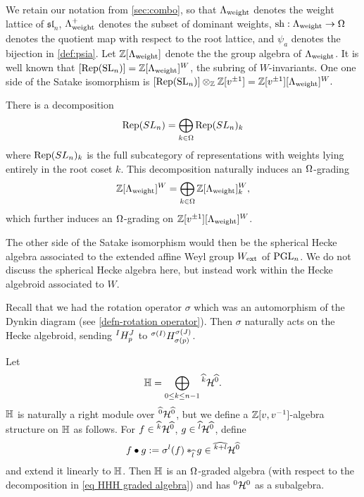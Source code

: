 We retain our notation from \cref{sec:combo}, so that $\Lambda_{\operatorname{weight}}$ denotes the weight lattice of $\mathfrak{sl}_n$, $\Lambda_{\operatorname{weight}}^+$ denotes the subset of dominant weights, $\operatorname{sh}: \Lambda_{\operatorname{weight}} \rightarrow \Omega$ denotes the quotient map with respect to the root lattice, and $\psi_a$ denotes the bijection in \cref{def:psia}.
Let $\mathbb{Z}[\Lambda_{\operatorname{weight}}]$ denote the the group algebra of $\Lambda_{\operatorname{weight}}$.
It is well known that $[\operatorname{Rep}(\operatorname{SL}_n)]=\mathbb{Z}[\Lambda_{\operatorname{weight}}]^W$, the subring of $W$-invariants.
One one side of the Satake isomorphism is $[\operatorname{Rep}(\operatorname{SL}_n)]\otimes_{\mathbb{Z}} \mathbb{Z}[v^{\pm 1}]=\mathbb{Z}[v^{\pm 1}][\Lambda_{\operatorname{weight}}]^W.$

There is a decomposition $$\operatorname{Rep}(SL_n)=\bigoplus_{k \in \Omega}\operatorname{Rep}(SL_n)_{k}$$
where $\operatorname{Rep}(SL_n)_{k}$ is the full subcategory of representations with weights lying entirely in the root coset $k$. 
This decomposition naturally induces an $\Omega$-grading
\begin{equation}\label{eq grading on representation ring of sl_n}
   \mathbb{Z}[\Lambda_{\operatorname{weight}}]^W= \bigoplus_{k \in \Omega}\mathbb{Z}[\Lambda_{\operatorname{weight}}]^W_k,
\end{equation}
which further induces an $\Omega$-grading on $\mathbb{Z}[v^{\pm 1}][\Lambda_{\operatorname{weight}}]^W$.



The other side of the Satake isomorphism would then be the spherical Hecke algebra associated to the extended affine Weyl group $W_{\operatorname{ext}}$ of $\operatorname{PGL}_n$.
We do not discuss the spherical Hecke algebra here, but instead work within the Hecke algebroid associated to $W$.

Recall that we had the rotation operator $\sigma$ which was an automorphism of the Dynkin diagram (see \cref{defn-rotation operator}). 
Then $\sigma$ naturally acts on the Hecke algebroid, sending ${}^{I}H^{J}_{p}$ to ${}^{\sigma(I)}H^{\sigma(J)}_{\sigma(p)}$.

\begin{defn}\label{defn the algebra HHH}
Let 
\begin{equation}\label{eq HHH graded algebra}
    \mathbb{H}=\bigoplus_{0\leq k \leq n-1}{}^{\widehat{k}}\mathcal{H}^{\widehat{0}}.
\end{equation} 
$\mathbb{H}$ is naturally a right module over ${}^{\widehat{0}}\mathcal{H}^{\widehat{0}}$, but we define a $\mathbb{Z}[v,v^{-1}]$-algebra structure on $\mathbb{H}$ as follows.
For $f \in {}^{\widehat{k}}\mathcal{H}^{\widehat{0}}$, $g \in {}^{\widehat{l}}\mathcal{H}^{\widehat{0}}$, define
\begin{equation} \label{eq:badmultyuck}
    f\bullet g:= \sigma^l(f)\ast_{\widehat{l}}g \in {}^{\widehat{k+l}}\mathcal{H}^{\widehat{0}}
\end{equation}
and extend it linearly to $\mathbb{H}$. 
Then $\mathbb{H}$ is an $\Omega$-graded algebra (with respect to the decomposition in \cref{eq HHH graded algebra}) and has ${}^{0}\mathcal{H}^{0}$ as a subalgebra.
\end{defn}

